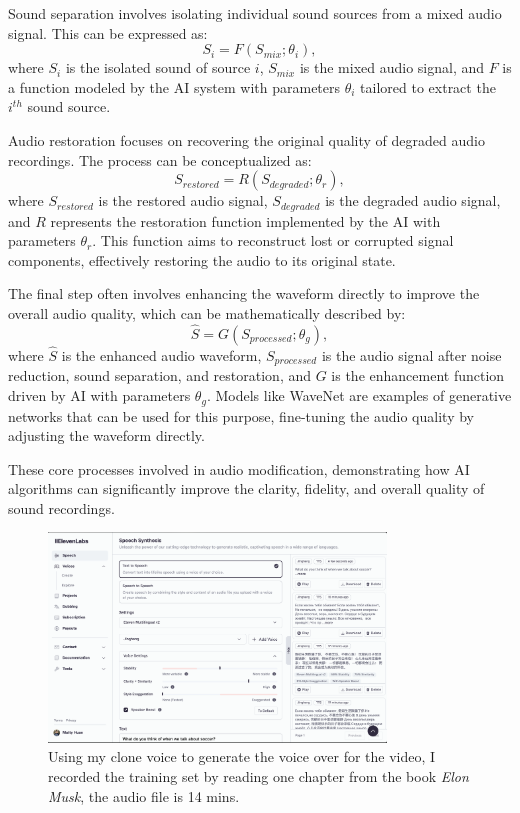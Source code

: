 \documentclass[11pt,a4paper,oneside]{report}
\begin{document}
Sound separation involves isolating individual sound sources from a mixed audio signal. This can be expressed as:
\begin{equation}
S_i = F(S_{mix}; \theta_i),
\end{equation}
where $S_i$ is the isolated sound of source $i$, $S_{mix}$ is the mixed audio signal, and $F$ is a function modeled by the AI system with parameters $\theta_i$ tailored to extract the $i^{th}$ sound source.

Audio restoration focuses on recovering the original quality of degraded audio recordings. The process can be conceptualized as:
\begin{equation}
S_{restored} = R(S_{degraded}; \theta_r),
\end{equation}
where $S_{restored}$ is the restored audio signal, $S_{degraded}$ is the degraded audio signal, and $R$ represents the restoration function implemented by the AI with parameters $\theta_r$. This function aims to reconstruct lost or corrupted signal components, effectively restoring the audio to its original state.

The final step often involves enhancing the waveform directly to improve the overall audio quality, which can be mathematically described by:
\begin{equation}
\hat{S} = G(S_{processed}; \theta_g),
\end{equation}
where $\hat{S}$ is the enhanced audio waveform, $S_{processed}$ is the audio signal after noise reduction, sound separation, and restoration, and $G$ is the enhancement function driven by AI with parameters $\theta_g$. Models like WaveNet are examples of generative networks that can be used for this purpose, fine-tuning the audio quality by adjusting the waveform directly.

These core processes involved in audio modification, demonstrating how AI algorithms can significantly improve the clarity, fidelity, and overall quality of sound recordings. 

\begin{figure}[htbp]
  \centering
  \includegraphics[width=0.8\textwidth]{ElevenLabs.png}
  \caption{Using my clone voice to generate the voice over for the video, I recorded the training set by reading one chapter from the book \textit{Elon Musk}, the audio file is 14 mins.}
\end{figure}
\end{document}
